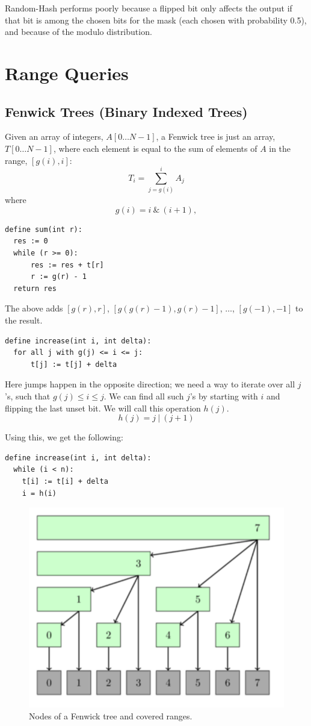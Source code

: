 \documentclass[12pt]{article}
\begin{document}
Random-Hash performs poorly because a flipped bit only affects the output if that bit is among the chosen bits for the mask (each chosen with probability 0.5), and because of the modulo distribution.

\section{Range Queries}\label{sec:range-queries-detail}

\subsection{Fenwick Trees (Binary Indexed Trees)\cite{fenwick_tree_cp}}
Given an array of integers, $A[0 \dots N-1]$, a Fenwick tree is just an array, $T[0 \dots N-1]$, where each element is equal to the sum of elements of $A$ in the range, $[g(i), i]$:  
$$T_i = \sum_{j = g(i)}^{i}{A_j}$$  
where
$$g(i) = i ~\&~ (i+1),$$
\begin{verbatim}
define sum(int r):
  res := 0
  while (r >= 0):
      res := res + t[r]
      r := g(r) - 1
  return res
\end{verbatim}
The above adds $[g(r), r]$, $[g(g(r) - 1), g(r) - 1]$, $\dots$, $[g(-1), -1]$ to the result.

\begin{verbatim}
define increase(int i, int delta):
  for all j with g(j) <= i <= j:
      t[j] := t[j] + delta
\end{verbatim}
Here jumps happen in the opposite direction; we need a way to iterate over all $j$'s, such that
$g(j) \le i \le j$.
We can find all such $j$'s by starting with $i$ and flipping the last unset bit. We will call this operation $h(j)$.
$$h(j) = j ~|~ (j+1)$$

Using this, we get the following:
\begin{verbatim}
define increase(int i, int delta):
  while (i < n):
    t[i] := t[i] + delta
    i = h(i)
\end{verbatim}

\begin{figure}[H]
  \centering
  \includegraphics[width=0.7\linewidth]{fenwick.png}
  \caption{Nodes of a Fenwick tree and covered ranges.\cite{fenwick_tree_cp}}
\end{figure}
\end{document}
